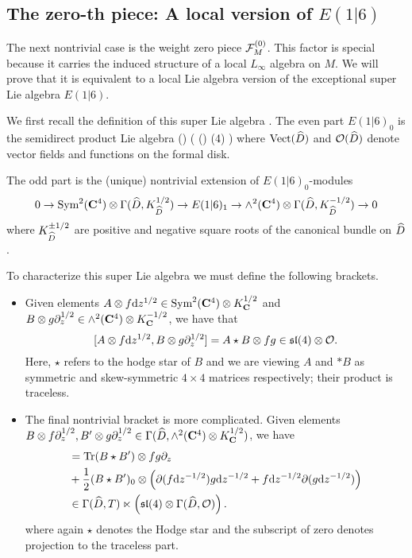 \documentclass[../main.tex]{subfiles}
\begin{document}
\subsection{The zero-th piece: A local version of $E(1|6)$}
\parsec[] The next nontrivial case is the weight zero piece $\mathcal F^{(0)}_M$. 
This factor is special because it carries the induced structure of a local $L_\infty$ algebra on $M$. 
We will prove that it is equivalent to a local Lie algebra version of the exceptional super Lie algebra $E(1|6)$. 

We first recall the definition of this super Lie algebra \cite{KacBible}. 
The even part $E(1|6)_0$ is the semidirect product Lie algebra 
\beqn
\Vect() \ltimes \left( \cO() \otimes {}(4) \right )
\eeqn
where $\Vect(\Hat{D})$ and $\cO(\Hat{D})$ denote vector fields and functions on the formal disk.

The odd part is the (unique) nontrivial extension of $E(1|6)_0$-modules 
\[0\to \Sym^2 (\C^4)\otimes \Gamma(\Hat{D}, K^{1/2}_{\Hat{D}}) \to E(1|6)_1 \to \wedge^2 (\C^4) \otimes \Gamma(\Hat{D}, K^{-1/2}_{\Hat{D}}) \to 0 
\]
where $K^{\pm 1/2}_{\Hat{D}}$ are positive and negative square roots of the canonical bundle on $\Hat{D}$.

To characterize this super Lie algebra we must define the following brackets.
\begin{itemize}
\item Given elements $A \otimes f \mathrm{d} z^{1/2}\in \text{Sym}^2 (\mathbf{C}^4)\otimes K^{1/2}_{\mathbf{C}}$ and $B\otimes g \partial_z^{1/2}\in \wedge^2 (\mathbf{C}^4)\otimes K^{-1/2}_{\mathbf{C}}$, we have that
\[
[A \otimes f \mathrm{d} z^{1/2}, B\otimes g \partial_z^{1/2}] = A \star B \otimes fg \in \mathfrak{sl}(4)\otimes \mathcal{O}.
\]
Here, $\star$ refers to the hodge star of $B$ and we are viewing $A$ and $*B$ as symmetric and skew-symmetric $4\times 4$ matrices respectively; their product is traceless. 

\item The final nontrivial bracket is more complicated. 
Given elements $B \otimes f \partial_z^{1/2}, B'\otimes g \partial_z^{1/2} \in \Gamma( \widehat D, \wedge^2 (\mathbf{C}^4) \otimes K^{1/2}_{\mathbf{C}})$, we have
\begin{align*}
[B\otimes f \d z^{-1/2} , B' \otimes g \d z^{-1/2} ] & = \tr (B \star B') \otimes fg \del_z \\ & + \frac12 (B \star B')_0 \otimes \left (\del (f \d z^{-1/2} ) g \d z^{-1/2} + f \d z^{-1/2} \del (g \d z^{-1/2} ) \right ) \\
& \in \Gamma (\hat D, T) \ltimes \left (\mf {sl}(4) \otimes \Gamma (\hat D, \mc O) \right ) .
\end{align*}
where again $\star$ denotes the Hodge star and the subscript of zero denotes projection to the traceless part. 
\end{itemize}
\end{document}
